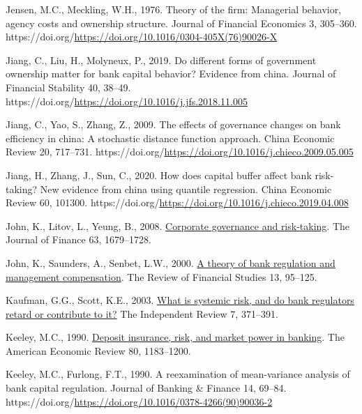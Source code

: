 \documentclass[
  12pt,
  a4paper,
]{scrreprt}
\newlength{\cslhangindent}
\newenvironment{CSLReferences}[2] %
 {\begin{list}{}{%
  \setlength{\itemindent}{0pt}
  \setlength{\leftmargin}{0pt}
  \setlength{\parsep}{0pt}
  \ifodd #1
   \setlength{\leftmargin}{\cslhangindent}
   \setlength{\itemindent}{-1\cslhangindent}
  \fi
  \setlength{\itemsep}{#2\baselineskip}}}
 {\end{list}}
\begin{document}
\begin{CSLReferences}{1}{0}
Jensen, M.C., Meckling, W.H., 1976. Theory of the firm: Managerial
behavior, agency costs and ownership structure. Journal of Financial
Economics 3, 305--360.
https://doi.org/\url{https://doi.org/10.1016/0304-405X(76)90026-X}

Jiang, C., Liu, H., Molyneux, P., 2019. Do different forms of government
ownership matter for bank capital behavior? Evidence from china. Journal
of Financial Stability 40, 38--49.
https://doi.org/\url{https://doi.org/10.1016/j.jfs.2018.11.005}

Jiang, C., Yao, S., Zhang, Z., 2009. The effects of governance changes
on bank efficiency in china: A stochastic distance function approach.
China Economic Review 20, 717--731.
https://doi.org/\url{https://doi.org/10.1016/j.chieco.2009.05.005}

Jiang, H., Zhang, J., Sun, C., 2020. How does capital buffer affect bank
risk-taking? New evidence from china using quantile regression. China
Economic Review 60, 101300.
https://doi.org/\url{https://doi.org/10.1016/j.chieco.2019.04.008}

John, K., Litov, L., Yeung, B., 2008.
\href{http://www.jstor.org.queens.ezp1.qub.ac.uk/stable/25094487}{Corporate
governance and risk-taking}. The Journal of Finance 63, 1679--1728.

John, K., Saunders, A., Senbet, L.W., 2000.
\href{http://www.jstor.org.queens.ezp1.qub.ac.uk/stable/2646082}{A
theory of bank regulation and management compensation}. The Review of
Financial Studies 13, 95--125.

Kaufman, G.G., Scott, K.E., 2003.
\href{http://www.jstor.org/stable/24562449}{What is systemic risk, and
do bank regulators retard or contribute to it?} The Independent Review
7, 371--391.

Keeley, M.C., 1990.
\href{http://www.jstor.org.queens.ezp1.qub.ac.uk/stable/2006769}{Deposit
insurance, risk, and market power in banking}. The American Economic
Review 80, 1183--1200.

Keeley, M.C., Furlong, F.T., 1990. A reexamination of mean-variance
analysis of bank capital regulation. Journal of Banking \& Finance 14,
69--84.
https://doi.org/\url{https://doi.org/10.1016/0378-4266(90)90036-2}


\end{CSLReferences}
\end{document}
